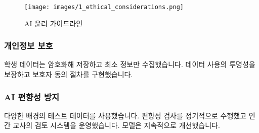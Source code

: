 \begin{figure}[H]
    \centering
    \texttt{[image: images/1\_ethical\_considerations.png]}
    \caption{AI 윤리 가이드라인}
    \label{fig:ethical_considerations}
\end{figure}

\subsubsection{개인정보 보호}

학생 데이터는 암호화해 저장하고 최소 정보만 수집했습니다. 데이터 사용의 투명성을 보장하고 보호자 동의 절차를 구현했습니다.

\subsubsection{AI 편향성 방지}

다양한 배경의 테스트 데이터를 사용했습니다. 편향성 검사를 정기적으로 수행했고 인간 교사의 검토 시스템을 운영했습니다. 모델은 지속적으로 개선했습니다.